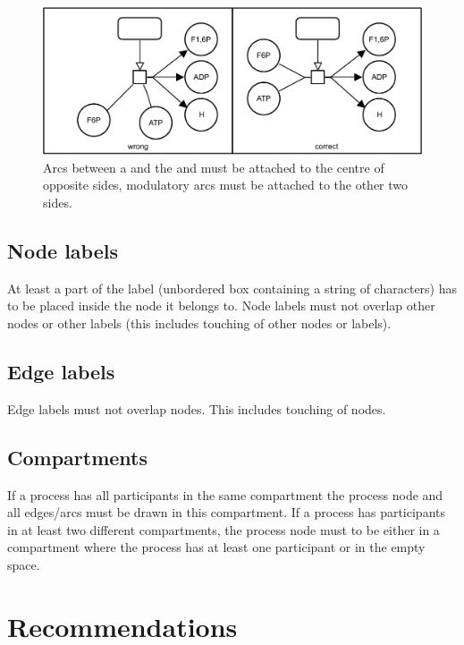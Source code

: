\begin{figure}[htb]
  \centering
  \includegraphics[scale=0.8]{images/build/layout_connecting_arcs.pdf}
  \caption{Arcs between a   and the  and  must be attached to the centre of opposite sides, modulatory
  arcs must be attached to the other two sides.}\label{fig:layout6}
\end{figure}

\subsection{Node labels}

At least a part of the label (unbordered box containing a string of characters) has to be placed inside the node it belongs to. Node labels must not overlap other nodes or other labels (this includes touching of other nodes or labels).

\subsection{Edge labels}

Edge labels must not overlap nodes. This includes touching of nodes.

\subsection{Compartments}

If a process has all participants in the same compartment the process node and all edges/arcs must be drawn in this compartment.  If a process has participants in at least two different compartments, the process node must to be either in a compartment where the process has at least one participant or in the empty space.

\section{Recommendations}

